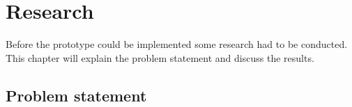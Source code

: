 \section{Research}
Before the prototype could be implemented some research had to be conducted. This chapter will explain the problem statement and discuss the results.

\subsection{Problem statement}






